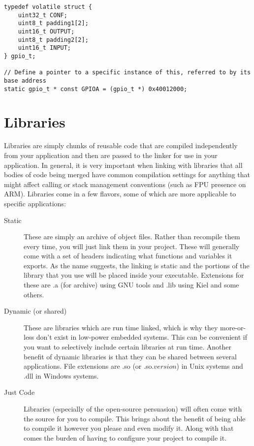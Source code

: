 \documentclass[10pt]{article}
\begin{document}
\begin{lstlisting}[label=lst-gpio-map,caption=Memory-mapped interface for GPIO port]
typedef volatile struct {
	uint32_t CONF;
	uint8_t padding1[2];
	uint16_t OUTPUT;
	uint8_t padding2[2];
	uint16_t INPUT;
} gpio_t;

// Define a pointer to a specific instance of this, referred to by its base address
static gpio_t * const GPIOA = (gpio_t *) 0x40012000;
\end{lstlisting}


\section{Libraries}

Libraries are simply chunks of reusable code that are compiled independently from your application and then are passed to the linker for use in your application. In general, it is very important when linking with libraries that all bodies of code being merged have common compilation settings for anything that might affect calling or stack management conventions (such as FPU presence on ARM). Libraries come in a few flavors, some of which are more applicable to specific applications:

\begin{description}
\item[Static] These are simply an archive of object files. Rather than recompile them every time, you will just link them in your project.
These will generally come with a set of headers indicating what functions and variables it exports. As the name suggests, the linking is static and the portions of the library that you use will be placed inside your executable. Extensions for these are .a (for archive) using GNU tools and .lib using Kiel and some others.

\item[Dynamic (or shared)] These are libraries which are run time linked, which is why they more-or-less don't exist in low-power embedded systems. This can be convenient if you want to selectively include certain libraries at run time. Another benefit of dynamic libraries is that they can be shared between several applications. File extensions are .so (or .so.$version$) in Unix systems and .dll in Windows systems.

\item[Just Code] Libraries (especially of the open-source persuasion) will often come with the source for you to compile. This brings about the benefit of being able to compile it however you please and even modify it. Along with that comes the burden of having to configure your project to compile it.

\end{description}
\end{document}
